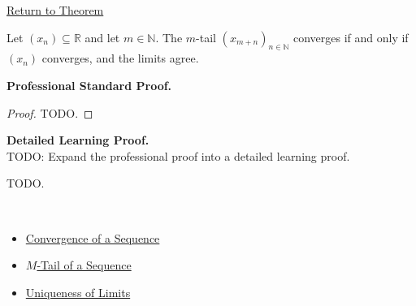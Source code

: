 \newpage
{}
\label{prf:convergence-of-tail}

\begin{remark*}[Return]
\hyperref[thm:convergence-of-tail]{Return to Theorem}
\end{remark*}

\begin{theorem*}
Let $(x_n) \subseteq \mathbb{R}$ and let $m \in \mathbb{N}$. The
$m$-tail $(x_{m+n})_{n\in\mathbb{N}}$ converges if and only if $(x_n)$
converges, and the limits agree.
\end{theorem*}

\textbf{Professional Standard Proof.}~\\
\begin{proof}
TODO.
\end{proof}

\textbf{Detailed Learning Proof.}~\\
TODO: Expand the professional proof into a detailed learning proof.


\begin{remark*}
TODO.
\end{remark*}

\begin{remark*}[Dependencies]~\\
\begin{itemize}
  \item \hyperref[def:convergent-sequence]{Convergence of a Sequence}
  \item \hyperref[def:m-tail]{$M$-Tail of a Sequence}
  \item \hyperref[thm:uniqueness-of-limits]{Uniqueness of Limits}
\end{itemize}
\end{remark*}
